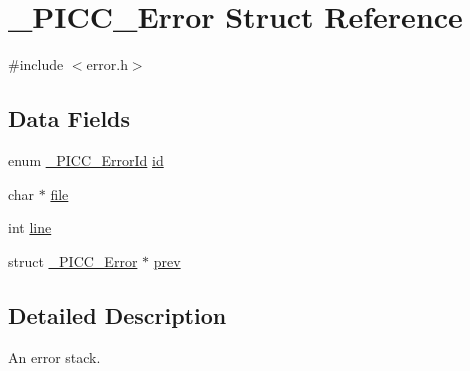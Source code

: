 \hypertarget{struct__PICC__Error}{\section{\-\_\-\-P\-I\-C\-C\-\_\-\-Error Struct Reference}
\label{struct__PICC__Error}
}


{\ttfamily \#include $<$error.\-h$>$}

\subsection*{Data Fields}
{\bf }\par
\begin{DoxyCompactItemize}
\item 
enum \hyperlink{errors_8h_a9c1e47db6d7c91cf096eaecd0eb79b64}{\-\_\-\-P\-I\-C\-C\-\_\-\-Error\-Id} \hyperlink{struct__PICC__Error_a35acbe51828a7168e5173904bd734c88}{id}
\item 
char $\ast$ \hyperlink{struct__PICC__Error_a01b9647a32f60a82c99b3b332387c7e4}{file}
\item 
int \hyperlink{struct__PICC__Error_ac2f7d3e5215d6835458fabe4c08cdaf5}{line}
\item 
struct \hyperlink{struct__PICC__Error}{\-\_\-\-P\-I\-C\-C\-\_\-\-Error} $\ast$ \hyperlink{struct__PICC__Error_a6a8e88acb1b847cdf6984c1600d2cef6}{prev}
\end{DoxyCompactItemize}



\subsection{Detailed Description}
An error stack. 


